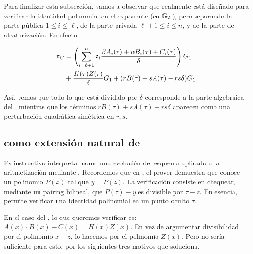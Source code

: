 Para finalizar esta subsección, vamos a observar que \Groth realmente está diseñado para verificar la identidad polinomial en el exponente (en $\mathbb{G}_T$), pero separando la parte pública $1 \leq i \leq \ell$, de la parte privada $\ell + 1 \leq i \leq n$, y de la parte de aleatorización. En efecto:

$$\begin{aligned}
	\pi_C &= \left(\sum_{i=\ell+1}^{n} \mathbf{z}_i \frac{\beta A_i(\tau) + \alpha B_i(\tau) + C_i(\tau)}{\delta}\right) G_1 \\
	&+ \frac{H(\tau)Z(\tau)}{\delta} G_1 + (rB(\tau) + sA(\tau) - rs\delta)G_1.
\end{aligned}$$

Así, vemos que todo lo que está dividido por $\delta$ corresponde a la parte algebraica del \QAP, mientras que los términos $rB(\tau) + sA(\tau) - rs\delta$ aparecen como una perturbación cuadrática simétrica en $r, s$.


\subsection{\Groth como extensión natural de \KZG}
\label{subsec:apendice-b-groth16-groth-como-extension-natural-de-kzg}

Es instructivo interpretar \Groth como una evolución del esquema \KZG aplicado a la aritmetización mediante \QAP. Recordemos que en \KZG, el prover demuestra que conoce un polinomio $P(x)$ tal que $y = P(z)$. La verificación consiste en chequear, mediante un pairing bilineal, que $P(\tau) - y$ es divisible por $\tau - z$. En esencia, \KZG permite verificar una identidad polinomial en un punto oculto $\tau$.

En el caso del \QAP, lo que queremos verificar es: $A(x) \cdot B(x) - C(x) = H(x) Z(x)$. En vez de argumentar divisibilidad por el polinomio $x - z$, lo hacemos por el polinomio $Z(x)$. Pero \KZG no sería suficiente para esto, por los siguientes tres motivos que \Groth soluciona.

